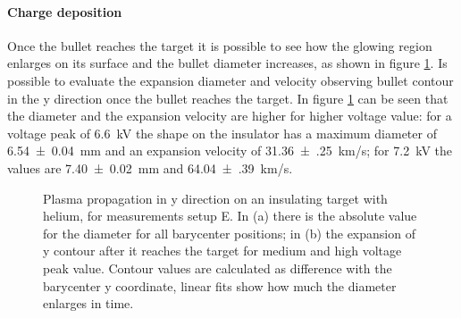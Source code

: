 \paragraph{Charge deposition}
Once the bullet reaches the target it is possible to see how the glowing region enlarges on its surface and the bullet diameter increases, as shown in figure \ref{fig:elio_c_ylim}. Is possible to evaluate the expansion diameter and velocity observing bullet contour in the y direction once the bullet reaches the target. In figure \ref{fig:elio_c_ylim} can be seen that the diameter and the expansion velocity are higher for higher voltage value: for a voltage peak of \SI{6.6}{\kilo\volt} the shape on the insulator has a maximum diameter of \SI{6.54(4)}{\milli\meter} and an expansion velocity of \SI{31.36(25)}{\kilo\meter/\second}; for \SI{7.2}{\kilo\volt} the values are \SI{7.40(2)}{\milli\meter} and \SI{64.04(39)}{\kilo\meter/\second}. %
\begin{figure}
 \centering
 \hfill
 \caption{Plasma propagation in y direction on an insulating target with helium, for measurements setup E. In (a) there is the absolute value for the diameter for all barycenter positions; in (b) the expansion of y contour after it reaches the target for medium and high voltage peak value. Contour values are calculated as difference with the barycenter y coordinate, linear fits show how much the diameter enlarges in time.}
 \label{fig:elio_c_ylim}
\end{figure}


